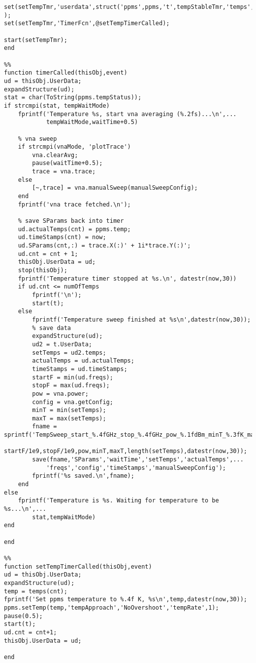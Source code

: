 \begin{lstlisting}
set(setTempTmr,'userdata',struct('ppms',ppms,'t',tempStableTmr,'temps',temps,'cnt',1) );
set(setTempTmr,'TimerFcn',@setTempTimerCalled);

start(setTempTmr);
end

%%
function timerCalled(thisObj,event)
ud = thisObj.UserData;
expandStructure(ud);
stat = char(ToString(ppms.tempStatus));
if strcmpi(stat, tempWaitMode)
    fprintf('Temperature %s, start vna averaging (%.2fs)...\n',...
            tempWaitMode,waitTime+0.5)
    
    % vna sweep
    if strcmpi(vnaMode, 'plotTrace')
        vna.clearAvg;
        pause(waitTime+0.5);
        trace = vna.trace;
    else
        [~,trace] = vna.manualSweep(manualSweepConfig);
    end
    fprintf('vna trace fetched.\n');
    
    % save SParams back into timer
    ud.actualTemps(cnt) = ppms.temp;
    ud.timeStamps(cnt) = now;
    ud.SParams(cnt,:) = trace.X(:)' + 1i*trace.Y(:)';
    ud.cnt = cnt + 1;
    thisObj.UserData = ud;
    stop(thisObj);
    fprintf('Temperature timer stopped at %s.\n', datestr(now,30))
    if ud.cnt <= numOfTemps
        fprintf('\n');
        start(t);
    else
        fprintf('Temperature sweep finished at %s\n',datestr(now,30));
        % save data
        expandStructure(ud);
        ud2 = t.UserData;
        setTemps = ud2.temps;
        actualTemps = ud.actualTemps;
        timeStamps = ud.timeStamps;
        startF = min(ud.freqs);
        stopF = max(ud.freqs);
        pow = vna.power;
        config = vna.getConfig;
        minT = min(setTemps);
        maxT = max(setTemps);
        fname = sprintf('TempSweep_start_%.4fGHz_stop_%.4fGHz_pow_%.1fdBm_minT_%.3fK_maxT_%.3fK_numT_%d_%s.mat',...
            startF/1e9,stopF/1e9,pow,minT,maxT,length(setTemps),datestr(now,30));
        save(fname,'SParams','waitTime','setTemps','actualTemps',...
            'freqs','config','timeStamps','manualSweepConfig');
        fprintf('%s saved.\n',fname);
    end
else
    fprintf('Temperature is %s. Waiting for temperature to be %s...\n',...
        stat,tempWaitMode)
end

end

%%
function setTempTimerCalled(thisObj,event)
ud = thisObj.UserData;
expandStructure(ud);
temp = temps(cnt);
fprintf('Set ppms temperature to %.4f K, %s\n',temp,datestr(now,30));
ppms.setTemp(temp,'tempApproach','NoOvershoot','tempRate',1);
pause(0.5);
start(t);
ud.cnt = cnt+1;
thisObj.UserData = ud;

end
\end{lstlisting}

